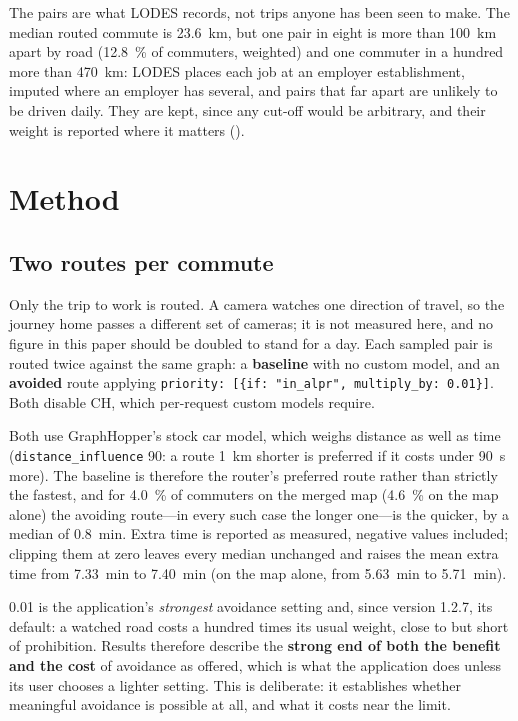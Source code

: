 \documentclass[11pt,twoside]{article}
\begin{document}
The pairs are what LODES records, not trips anyone has been seen to make. The median routed
commute is \SI{23.6}{\kilo\metre}, but one pair in eight is more than \SI{100}{\kilo\metre}
apart by road (\SI{12.8}{\percent} of commuters, weighted) and one commuter in a hundred more
than \SI{470}{\kilo\metre}: LODES places each job at an employer establishment, imputed where an
employer has several, and pairs that far apart are unlikely to be driven daily. They are kept,
since any cut-off would be arbitrary, and their weight is reported where it matters
().

\section{Method}
\label{sec:method}

\subsection{Two routes per commute}

Only the trip to work is routed. A camera watches one direction of travel, so the journey home
passes a different set of cameras; it is not measured here, and no figure in this paper should
be doubled to stand for a day. Each sampled pair is routed twice against the same graph: a
\textbf{baseline} with no custom model, and an \textbf{avoided} route applying
\texttt{priority: [\{if: "in\_alpr", multiply\_by: 0.01\}]}. Both disable CH, which
per-request custom models require.

Both use GraphHopper's stock car model, which weighs distance as well as time
(\texttt{distance\_\allowbreak influence} 90: a route \SI{1}{\kilo\metre} shorter is preferred if it
costs under \SI{90}{\second} more). The baseline is therefore the router's preferred route
rather than strictly the fastest, and for \SI{4.0}{\percent} of commuters on the merged map
(\SI{4.6}{\percent} on the map alone) the avoiding route---in every such case the longer
one---is the quicker, by a median of \SI{0.8}{\minute}. Extra time is reported as measured,
negative values included; clipping them at zero leaves every median unchanged and raises the
mean extra time from \SI{7.33}{\minute} to \SI{7.40}{\minute} (on the map alone, from
\SI{5.63}{\minute} to \SI{5.71}{\minute}).

\num{0.01} is the application's \emph{strongest} avoidance setting and, since version 1.2.7,
its default: a watched road costs a hundred times its usual weight, close to but short of
prohibition. Results therefore describe the \textbf{strong end of both the benefit and the
cost} of avoidance as offered, which is what the application does unless its user chooses a
lighter setting. This is deliberate: it establishes whether meaningful avoidance is possible at
all, and what it costs near the limit.
\end{document}
